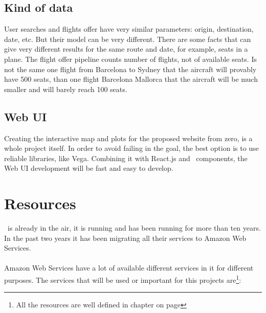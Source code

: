 \subsection{Kind of data}

User searches and flights offer have very similar parameters: origin, destination, date, etc. But their model can be very different. There are some facts that can give very different results for the same route and date, for example, seats in a plane. The flight offer pipeline counts number of flights, not of available seats. Is not the same one flight from Barcelona to Sydney that the aircraft will provably have 500 seats, than one flight Barcelona Mallorca that the aircraft will be much smaller and will barely reach 100 seats.

\subsection{Web UI}

Creating the interactive map and plots for the proposed website from zero, is a whole project itself. In order to avoid failing in the \textit{} goal, the best option is to use reliable libraries, like Vega\cite{vega}. Combining it with React.js and \company\ components, the Web UI development will be fast and easy to develop.


\section{Resources} \label{resources}

\company\ is already in the air, it is running and has been running for more than ten years. In the past two years it has been migrating all their services to Amazon Web Services\cite{aws}.
\\\\
Amazon Web Services have a lot of available different services in it for different purposes. The services that will be used or important for this projects are\footnote{All the resources are well defined in chapter  on page \pageref{chapter06}}:

